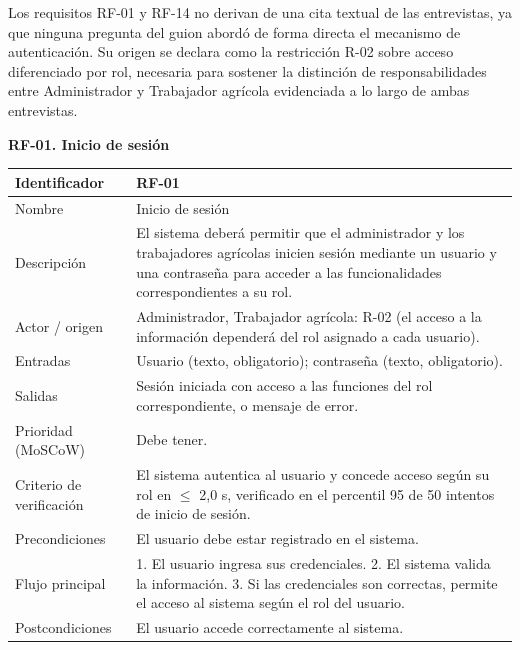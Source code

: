 \documentclass[12pt,a4paper]{article}
\begin{document}
Los requisitos RF-01 y RF-14 no derivan de una cita textual de las entrevistas, ya que ninguna pregunta del guion abordó de forma directa el mecanismo de autenticación. Su origen se declara como la restricción R-02 sobre acceso diferenciado por rol, necesaria para sostener la distinción de responsabilidades entre Administrador y Trabajador agrícola evidenciada a lo largo de ambas entrevistas.

\begin{minipage}{\linewidth}
\bigskip
\noindent\textbf{RF-01. Inicio de sesión}
\label{tab:RF-01}

\begin{center}
\begin{tabular}{|p{3.5cm}|p{10.7cm}|}
\hline
Identificador & RF-01 \\
\hline
Nombre & Inicio de sesión \\
\hline
Descripción & El sistema deberá permitir que el administrador y los trabajadores agrícolas inicien sesión mediante un usuario y una contraseña para acceder a las funcionalidades correspondientes a su rol. \\
\hline
Actor / origen & Administrador, Trabajador agrícola: R-02 (el acceso a la información dependerá del rol asignado a cada usuario). \\
\hline
Entradas & Usuario (texto, obligatorio); contraseña (texto, obligatorio). \\
\hline
Salidas & Sesión iniciada con acceso a las funciones del rol correspondiente, o mensaje de error. \\
\hline
Prioridad (MoSCoW) & Debe tener. \\
\hline
Criterio de verificación & El sistema autentica al usuario y concede acceso según su rol en $\leq$ 2,0 s, verificado en el percentil 95 de 50 intentos de inicio de sesión. \\
\hline
Precondiciones & El usuario debe estar registrado en el sistema. \\
\hline
Flujo principal & 1. El usuario ingresa sus credenciales. 2. El sistema valida la información. 3. Si las credenciales son correctas, permite el acceso al sistema según el rol del usuario. \\
\hline
Postcondiciones & El usuario accede correctamente al sistema. \\
\hline
\end{tabular}
\end{center}
\end{minipage}
\end{document}
